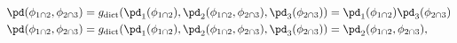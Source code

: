 \begin{align}
  \pd(\phi_{1 \cap 2}, \phi_{2 \cap 3}) = 
    g_{\text{dict}}(\pd_{1}(\phi_{1 \cap 2}), \pd_{2}(\phi_{1 \cap 2}, \phi_{2 \cap 3}), \pd_{3}(\phi_{2 \cap 3})) &=
    \pd_{1}(\phi_{1 \cap 2}) \pd_{3}(\phi_{2 \cap 3}) \label{eqn:dictatorial-pooling-one} \\
  \pd(\phi_{1 \cap 2}, \phi_{2 \cap 3}) = 
    g_{\text{dict}}(\pd_{1}(\phi_{1 \cap 2}), \pd_{2}(\phi_{1 \cap 2}, \phi_{2 \cap 3}), \pd_{3}(\phi_{2 \cap 3})) &=
    \pd_{2}(\phi_{1 \cap 2}, \phi_{2 \cap 3}), \label{eqn:dictatorial-pooling-two}
\end{align}